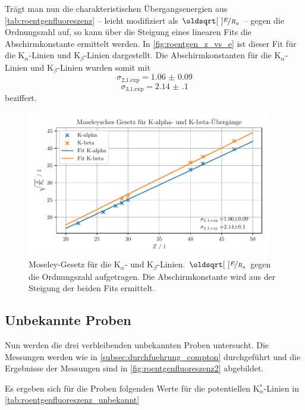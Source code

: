 \documentclass[ngerman]{scrartcl}
\begin{document}
%
Trägt man nun die charakteristischen Übergangsenergien aus \autoref{tab:roentgenfluoreszenz} -- leicht modifiziert als $\sqrt{\nicefrac{E}{R_y}}$ -- gegen die Ordnungszahl auf, so kann über die Steigung eines linearen Fits die Abschirmkonstante ermittelt werden. In \autoref{fig:roentgen_z_vs_e} ist dieser Fit für die K$_{\alpha}$-Linien und K$_{\beta}$-Linien dargestellt. Die Abschirmkonstanten für die K$_{\alpha}$-Linien und K$_{\beta}$-Linien wurden somit mit
\[\sigma_{\text{2,1,exp}} = \num{1.06(9)} \]
\[\sigma_{\text{3,1,exp}} = \num{2.14(10)}\]
beziffert.
%
\begin{figure}[H]
    \centering
    \begin{samepage}
        \includegraphics[width=0.95\textwidth]{../plots/roentgen_data_Z_vs_E.pdf}
        \caption[Mosley-Gesetz für die K$_{\alpha}$- und K$_{\beta}$-Linien.]{Moseley-Gesetz für die K$_{\alpha}$- und K$_{\beta}$-Linien. $\sqrt{\nicefrac{E}{R_y}}$ gegen die Ordnungszahl aufgetragen. Die Abschirmkonstante wird aus der Steigung der beiden Fits ermittelt.}
        \label{fig:roentgen_z_vs_e}
    \end{samepage}
\end{figure}


\subsection{Unbekannte Proben}
\label{sec:roentgen_unbekannt}

Nun werden die drei verbleibenden unbekannten Proben untersucht. Die Messungen werden wie in \autoref{subsec:durchfuehrung_compton} durchgeführt und die Ergebnisse der Messungen sind in \autoref{fig:roentgenfluoreszenz2} abgebildet. 

Es ergeben sich für die Proben folgenden Werte für die potentiellen K$_{\alpha}^*$-Linien in \autoref{tab:roentgenfluoreszenz_unbekannt}
\end{document}
